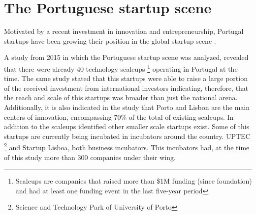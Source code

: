 	\section{The Portuguese startup scene} \label{sec:stateoftheart:sec:portuguesestartupscene}
  Motivated by a recent investment in innovation and entrepreneurship, Portugal startups have been growing their position in the global startup scene \cite{Coleman2015}.

  A study from 2015 \citet{StartupEuropePartnership2015} in which the Portuguese startup scene was analyzed, revealed that there were already 40 technology scaleups \footnote{Scaleups are companies that raised more than \$1M funding (since foundation) and had at least one funding event in the last five-year period } operating in Portugal at the time. The same study stated that this startups were able to raise a large portion of the received investment from international investors indicating, therefore, that the reach and scale of this startups was broader than just the national arena. Additionally, it is also indicated in the study that Porto and Lisbon are the main centers of innovation, encompassing 70\% of the total of existing scaleups. In addition to the scaleups identified other smaller scale startups exist. Some of this startups are currently being incubated in incubators around the country. UPTEC \footnote{Science and Technology Park of University of Porto} and Startup Lisboa, both business incubators. This incubators had, at the time of this study more than 300 companies \cite{Uptec,StartupLisboa} under their wing.
